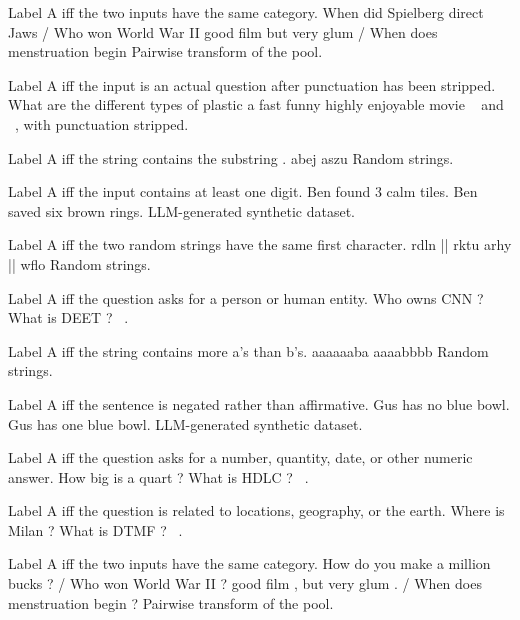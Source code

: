 \documentclass[11pt, letterpaper]{article}
\begin{document}
{Label A iff the two inputs have the same  category.}
{When did Spielberg direct Jaws / Who won World War II}
{good film but very glum / When does menstruation begin}
{Pairwise transform of the  pool.}

{Label A iff the input is an actual question after punctuation has been stripped.}
{What are the different types of plastic}
{a fast funny highly enjoyable movie}
{~\cite{li-roth-2002} and ~\cite{socher-etal-2013}, with punctuation stripped.}

{Label A iff the string contains the substring .}
{abej}
{aszu}
{Random strings.}

{Label A iff the input contains at least one digit.}
{Ben found 3 calm tiles.}
{Ben saved six brown rings.}
{LLM-generated synthetic dataset.}

{Label A iff the two random strings have the same first character.}
{rdln || rktu}
{arhy || wflo}
{Random strings.}

{Label A iff the question asks for a person or human entity.}
{Who owns CNN ?}
{What is DEET ?}
{~\cite{li-roth-2002}.}

{Label A iff the string contains more a's than b's.}
{aaaaaaba}
{aaaabbbb}
{Random strings.}

{Label A iff the sentence is negated rather than affirmative.}
{Gus has no blue bowl.}
{Gus has one blue bowl.}
{LLM-generated synthetic dataset.}

{Label A iff the question asks for a number, quantity, date, or other numeric answer.}
{How big is a quart ?}
{What is HDLC ?}
{~\cite{li-roth-2002}.}

{Label A iff the question is related to locations, geography, or the earth.}
{Where is Milan ?}
{What is DTMF ?}
{~\cite{li-roth-2002}.}

{Label A iff the two inputs have the same  category.}
{How do you make a million bucks ? / Who won World War II ?}
{good film , but very glum . / When does menstruation begin ?}
{Pairwise transform of the  pool.}
\end{document}

